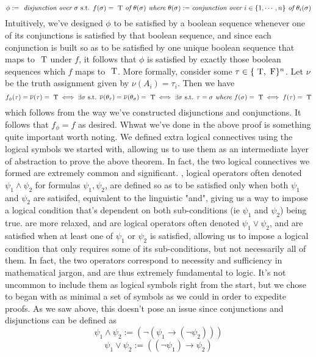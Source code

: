 \documentclass{article}
\begin{document}
{    $$ \phi := \textit{ disjunction over } \sigma \textnormal{ s.t. } f(\sigma) = \text{\normalfont\ T} \textit{ of } \theta(\sigma) \textit{ where } \theta(\sigma) := \textit{conjunction over } i \in \{ 1, \cdots, n \} \textit{ of } \theta_i(\sigma) $$
Intuitively, we've designed $ \phi $ to be satisfied by a boolean sequence whenever one of its conjunctions is satisfied by that boolean sequence, and since each conjunction is built so as to be satisfied by one unique boolean sequence that maps to $ \text{\normalfont\ T} $ under $ f $, it follows that $ \phi $ is satisfied by exactly those boolean sequences which $ f $ maps to $ \text{\normalfont\ T} $. More formally, consider some $ \tau \in \{ \text{\normalfont\ T}, \text{\normalfont\ F} \}^n $. Let $ \nu $ be the truth assignment given by $ \nu(A_i) = \tau_i $. Then we have
    $$ f_\phi(\tau) = \overline{\nu}(\tau) = \text{\normalfont\ T} \iff \exists \sigma \textnormal{ s.t. } \overline{\nu}(\theta_\tau) = \overline{\nu}(\theta_\sigma) = \text{\normalfont\ T} \iff \exists \sigma \textnormal{ s.t. } \tau = \sigma \textit{ where } f(\sigma) = \text{\normalfont\ T} \iff f(\tau) = \text{\normalfont\ T} $$
which follows from the way we've constructed disjunctions and conjunctions. It follows that $ f_\phi = f $ as desired.}
Whwat we've done in the above proof is something quite important worth noting. We defined extra logical connectives using the logical symbols we started with, allowing us to use them as an intermediate layer of abstraction to prove the above theorem. In fact, the two logical connectives we formed are extremely common and significant. , logical operators often denoted $ \psi_1 \land \psi_2 $ for formulas $ \psi_1, \psi_2 $, are defined so as to be satisfied only when both $ \psi_1 $ and $ \psi_2 $ are satisifed, equivalent to the linguistic "and", giving us a way to impose a logical condition that's dependent on both sub-conditions (ie $ \psi_1 $ and $ \psi_2 $) being true.  are more relaxed, and are logical operators often denoted $ \psi_1 \lor \psi_2 $, and are satisfied when at least one of $ \psi_1 $ or $ \psi_2 $ is satisfied, allowing us to impose a logical condition that only requires some of its sub-conditions, but not necessarily all of them. In fact, the two operators correspond to necessity and sufficiency in mathematical jargon, and are thus extremely fundamental to logic. It's not uncommon to include them as logical symbols right from the start, but we chose to began with as minimal a set of symbols as we could in order to expedite proofs. As we saw above, this doesn't pose an issue since conjunctions and disjunctions can be defined as
    $$ \psi_1 \land \psi_2 := (\neg (\psi_1 \rightarrow (\neg \psi_2))) $$
    $$ \psi_1 \lor \psi_2 := ((\neg \psi_1) \rightarrow \psi_2) $$
\end{document}
